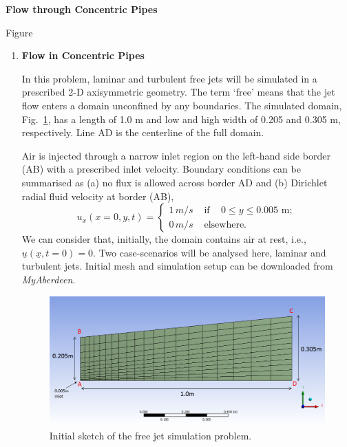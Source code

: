 \documentclass[12pts,a4paper,amsmath,amssymb,floatfix]{article}%
\renewcommand\leq{\leqslant}
\begin{document}
\begin{center}
  \Large{\bf Flow through Concentric Pipes}
\end{center}


\begin{center}
  \large{Figure}
\end{center}





\begin{enumerate}[label=\bfseries Problem \arabic*:]
   \item\label{Problem1} {\bf Flow in Concentric Pipes}

In this problem, laminar and turbulent free jets will be simulated in a prescribed 2-D axisymmetric geometry. The term `free' means that the jet flow enters a domain unconfined by any boundaries. The simulated domain, Fig.~\ref{EG501V_Assignment:Sketch1}, has a length of 1.0 m and low and high width of 0.205 and 0.305 m, respectively. Line AD is the centerline of the full domain.

Air is injected through a narrow inlet region on the left-hand side border (AB) with a prescribed inlet velocity. Boundary conditions can be summarised as (a) no flux is allowed across border AD %
and (b) Dirichlet radial fluid velocity at border (AB),
         \[ u_{x}( x=0, y, t) = \begin{cases}
             1\,m/s & \text{ if } \;\;\;0\leq y\leq 0.005 \text{ m}; \\
             0\,m/s & \text{ elsewhere.}
         \end{cases}\]
We can consider that, initially, the domain contains air at rest, i.e., $\underline{u}\left(\underline{x},t=0\right)=0$. Two case-scenarios will be analysed here, laminar and turbulent jets. Initial mesh and simulation setup can be downloaded from {\it MyAberdeen}.


\begin{figure}[h]
\begin{center}
\includegraphics[width=14.cm,height=8.cm,clip]{./Pics/free_jet_mesh.png}
\caption{Initial sketch of the free jet simulation problem. }
\label{EG501V_Assignment:Sketch1}
\end{center}
\end{figure}


\end{enumerate}
\end{document}
